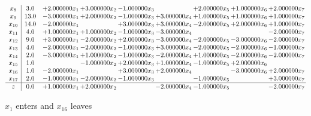 \documentclass[10pt]{article}
\begin{document}
\[\begin{array}{c| c c@{\hskip 2pt} c@{\hskip 2pt} c@{\hskip 2pt} c@{\hskip 2pt} c@{\hskip 2pt} c@{\hskip 2pt} c@{\hskip 2pt} }
 x_{8}   &  3.0 & + 2.000000 x_{1} & + 3.000000 x_{2} & -1.000000 x_{3} &   & + 2.000000 x_{5} & + 1.000000 x_{6} & + 2.000000 x_{7}\\
 x_{9}   &  13.0 & -3.000000 x_{1} & + 2.000000 x_{2} & -1.000000 x_{3} & + 3.000000 x_{4} & + 1.000000 x_{5} & + 1.000000 x_{6} & + 1.000000 x_{7}\\
 x_{10}   &  14.0 & -2.000000 x_{1} &   & + 3.000000 x_{3} & + 3.000000 x_{4} & -2.000000 x_{5} & + 2.000000 x_{6} & + 1.000000 x_{7}\\
 x_{11}   &  4.0 & + 1.000000 x_{1} & + 1.000000 x_{2} & -1.000000 x_{3} & -3.000000 x_{4} &    &   & -2.000000 x_{7}\\
 x_{12}   &  9.0 & + 3.000000 x_{1} & -2.000000 x_{2} & + 2.000000 x_{3} & -3.000000 x_{4} & -2.000000 x_{5} & -3.000000 x_{6} & -2.000000 x_{7}\\
 x_{13}   &  4.0 & -2.000000 x_{1} & -2.000000 x_{2} & -1.000000 x_{3} & + 3.000000 x_{4} & -2.000000 x_{5} & -2.000000 x_{6} & -1.000000 x_{7}\\
 x_{14}   &  2.0 & -3.000000 x_{1} & + 1.000000 x_{2} & -1.000000 x_{3} & -2.000000 x_{4} & + 1.000000 x_{5} & -2.000000 x_{6} & -2.000000 x_{7}\\
 x_{15}   &  1.0  &   & -1.000000 x_{2} & + 2.000000 x_{3} & + 1.000000 x_{4} & -1.000000 x_{5} & + 2.000000 x_{6} &   \\
 x_{16}   &  1.0 & -2.000000 x_{1} &   & + 3.000000 x_{3} & + 2.000000 x_{4} &   & -3.000000 x_{6} & + 2.000000 x_{7}\\
 x_{17}   &  2.0 & -1.000000 x_{1} & -2.000000 x_{2} & -1.000000 x_{3} &   & -1.000000 x_{5} &   & + 3.000000 x_{7}\\
\hline
z    &  0.0 & + 1.000000 x_{1} & + 2.000000 x_{2} &   & -2.000000 x_{4} & -1.000000 x_{5} &   & -2.000000 x_{7}\\
\end{array}\]


 $ x_{1} $ enters and $ x_{16} $ leaves 
\end{document}
